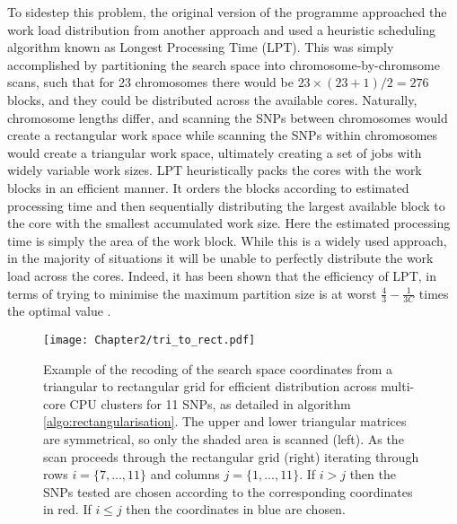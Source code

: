 To sidestep this problem, the original version of the programme approached the work load distribution from another approach and used a heuristic scheduling algorithm known as Longest Processing Time (LPT). This was simply accomplished by partitioning the search space into chromosome-by-chromsome scans, such that for 23 chromosomes there would be $23 \times (23+1) / 2 = 276$ blocks, and they could be distributed across the available cores. Naturally, chromosome lengths differ, and scanning the SNPs between chromosomes would create a rectangular work space while scanning the SNPs within chromosomes would create a triangular work space, ultimately creating a set of jobs with widely variable work sizes. LPT heuristically packs the cores with the work blocks in an efficient manner. It orders the blocks according to estimated processing time and then sequentially distributing the largest available block to the core with the smallest accumulated work size. Here the estimated processing time is simply the area of the work block. While this is a widely used approach, in the majority of situations it will be unable to perfectly distribute the work load across the cores. Indeed, it has been shown that the efficiency of LPT, in terms of trying to minimise the maximum partition size is at worst $\frac{4}{3}-\frac{1}{3C}$ times the optimal value \citep{Graham1969}.

\begin{figure}
\begin{center}
\texttt{[image: Chapter2/tri\_to\_rect.pdf]}
\caption[Distribution of triangular matrix work load]{Example of the recoding of the search space coordinates from a triangular to rectangular grid for efficient distribution across multi-core CPU clusters for 11 SNPs, as detailed in algorithm \ref{algo:rectangularisation}. The upper and lower triangular matrices are symmetrical, so only the shaded area is scanned (left). As the scan proceeds through the rectangular grid (right) iterating through rows $i = \{7,...,11\}$ and columns $j = \{1,...,11\}$. If $i > j$ then the SNPs tested are chosen according to the corresponding coordinates in red. If $i \leq j$ then the coordinates in blue are chosen.}
\label{fig:tri_to_rect}
\end{center}
\end{figure}


